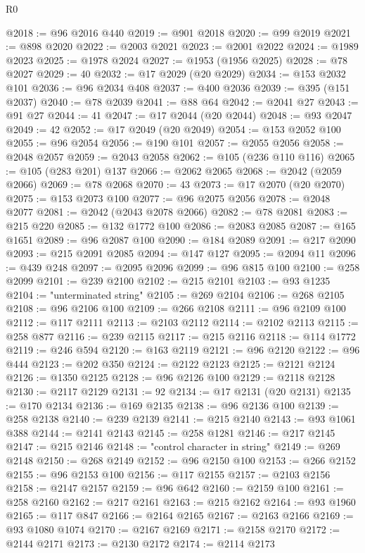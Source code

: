 \begin{lexlean}{R0}
\begin{coremodule}
@2018 := @96 @2016 @440
@2019 := @901 @2018
@2020 := @99 @2019
@2021 := @898 @2020
@2022 := @2003 @2021
@2023 := @2001 @2022
@2024 := @1989 @2023
@2025 := @1978 @2024
@2027 := @1953 (@1956 @2025)
@2028 := @78 @2027
@2029 := 40
@2032 := @17 @2029 (@20 @2029)
@2034 := @153 @2032 @101
@2036 := @96 @2034 @408
@2037 := @400 @2036
@2039 := @395 (@151 @2037)
@2040 := @78 @2039
@2041 := @88 @64
@2042 := @2041 @27
@2043 := @91 @27
@2044 := 41
@2047 := @17 @2044 (@20 @2044)
@2048 := @93 @2047
@2049 := 42
@2052 := @17 @2049 (@20 @2049)
@2054 := @153 @2052 @100
@2055 := @96 @2054
@2056 := @190 @101
@2057 := @2055 @2056
@2058 := @2048 @2057
@2059 := @2043 @2058
@2062 := @105 (@236 @110 @116)
@2065 := @105 (@283 @201) @137
@2066 := @2062 @2065
@2068 := @2042 (@2059 @2066)
@2069 := @78 @2068
@2070 := 43
@2073 := @17 @2070 (@20 @2070)
@2075 := @153 @2073 @100
@2077 := @96 @2075 @2056
@2078 := @2048 @2077
@2081 := @2042 (@2043 @2078 @2066)
@2082 := @78 @2081
@2083 := @215 @220
@2085 := @132 @1772 @100
@2086 := @2083 @2085
@2087 := @165 @1651
@2089 := @96 @2087 @100
@2090 := @184 @2089
@2091 := @217 @2090
@2093 := @215 @2091 @2085
@2094 := @147 @127
@2095 := @2094 @11
@2096 := @439 @248
@2097 := @2095 @2096
@2099 := @96 @815 @100
@2100 := @258 @2099
@2101 := @239 @2100
@2102 := @215 @2101
@2103 := @93 @1235
@2104 := "unterminated string"
@2105 := @269 @2104
@2106 := @268 @2105
@2108 := @96 @2106 @100
@2109 := @266 @2108
@2111 := @96 @2109 @100
@2112 := @117 @2111
@2113 := @2103 @2112
@2114 := @2102 @2113
@2115 := @258 @877
@2116 := @239 @2115
@2117 := @215 @2116
@2118 := @114 @1772
@2119 := @246 @594
@2120 := @163 @2119
@2121 := @96 @2120
@2122 := @96 @444
@2123 := @202 @350
@2124 := @2122 @2123
@2125 := @2121 @2124
@2126 := @1350 @2125
@2128 := @96 @2126 @100
@2129 := @2118 @2128
@2130 := @2117 @2129
@2131 := 92
@2134 := @17 @2131 (@20 @2131)
@2135 := @170 @2134
@2136 := @169 @2135
@2138 := @96 @2136 @100
@2139 := @258 @2138
@2140 := @239 @2139
@2141 := @215 @2140
@2143 := @93 @1061 @388
@2144 := @2141 @2143
@2145 := @258 @1281
@2146 := @217 @2145
@2147 := @215 @2146
@2148 := "control character in string"
@2149 := @269 @2148
@2150 := @268 @2149
@2152 := @96 @2150 @100
@2153 := @266 @2152
@2155 := @96 @2153 @100
@2156 := @117 @2155
@2157 := @2103 @2156
@2158 := @2147 @2157
@2159 := @96 @642
@2160 := @2159 @100
@2161 := @258 @2160
@2162 := @217 @2161
@2163 := @215 @2162
@2164 := @93 @1960
@2165 := @117 @847
@2166 := @2164 @2165
@2167 := @2163 @2166
@2169 := @93 @1080 @1074
@2170 := @2167 @2169
@2171 := @2158 @2170
@2172 := @2144 @2171
@2173 := @2130 @2172
@2174 := @2114 @2173

\end{coremodule}
\end{lexlean}
